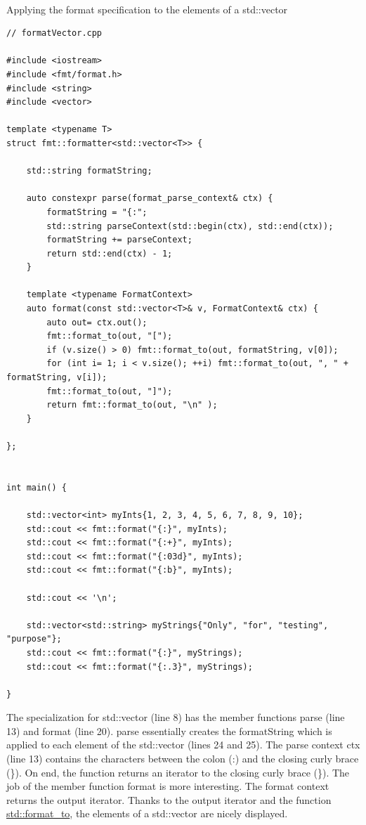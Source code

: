 \hspace*{\fill} \\ %
\noindent
Applying the format specification to the elements of a std::vector
\begin{lstlisting}[style=styleCXX]
// formatVector.cpp

#include <iostream>
#include <fmt/format.h>
#include <string>
#include <vector>

template <typename T>
struct fmt::formatter<std::vector<T>> {

	std::string formatString;
	
	auto constexpr parse(format_parse_context& ctx) {
		formatString = "{:";
		std::string parseContext(std::begin(ctx), std::end(ctx));
		formatString += parseContext;
		return std::end(ctx) - 1;
	}
	
	template <typename FormatContext>
	auto format(const std::vector<T>& v, FormatContext& ctx) {
		auto out= ctx.out();
		fmt::format_to(out, "[");
		if (v.size() > 0) fmt::format_to(out, formatString, v[0]);
		for (int i= 1; i < v.size(); ++i) fmt::format_to(out, ", " + formatString, v[i]);
		fmt::format_to(out, "]");
		return fmt::format_to(out, "\n" );
	}

};


int main() {

	std::vector<int> myInts{1, 2, 3, 4, 5, 6, 7, 8, 9, 10};
	std::cout << fmt::format("{:}", myInts);
	std::cout << fmt::format("{:+}", myInts);
	std::cout << fmt::format("{:03d}", myInts);
	std::cout << fmt::format("{:b}", myInts);
	
	std::cout << '\n';
	
	std::vector<std::string> myStrings{"Only", "for", "testing", "purpose"};
	std::cout << fmt::format("{:}", myStrings);
	std::cout << fmt::format("{:.3}", myStrings);

}
\end{lstlisting}

The specialization for std::vector (line 8) has the member functions parse (line 13) and format (line 20). parse essentially creates the formatString which is applied to each element of the std::vector (lines 24 and 25). The parse context ctx (line 13) contains the characters between the colon (:) and the closing curly brace (\}). On end, the function returns an iterator to the closing curly brace (\}). The job of the member function format is more interesting. The format context returns the output iterator. Thanks to the output iterator and the function \href{https://en.cppreference.com/w/cpp/utility/format/format_to}{std::format\_to}, the elements of a std::vector are nicely displayed.

